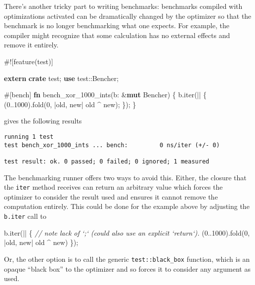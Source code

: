 \documentclass[a4paper,]{book}
\newenvironment{Shaded}{\begin{snugshade}}{\end{snugshade}}
\newcommand{\KeywordTok}[1]{\textcolor[rgb]{0.13,0.29,0.53}{\textbf{{#1}}}}
\newcommand{\DecValTok}[1]{\textcolor[rgb]{0.00,0.00,0.81}{{#1}}}
\newcommand{\CommentTok}[1]{\textcolor[rgb]{0.56,0.35,0.01}{\textit{{#1}}}}
\newcommand{\AttributeTok}[1]{\textcolor[rgb]{0.77,0.63,0.00}{{#1}}}
\newcommand{\NormalTok}[1]{{#1}}
\begin{document}
There's another tricky part to writing benchmarks: benchmarks compiled
with optimizations activated can be dramatically changed by the
optimizer so that the benchmark is no longer benchmarking what one
expects. For example, the compiler might recognize that some calculation
has no external effects and remove it entirely.

\begin{Shaded}
\begin{Highlighting}[]
\AttributeTok{#![}\NormalTok{feature}\AttributeTok{(}\NormalTok{test}\AttributeTok{)]}

\KeywordTok{extern} \KeywordTok{crate} \NormalTok{test;}
\KeywordTok{use} \NormalTok{test::Bencher;}

\AttributeTok{#[}\NormalTok{bench}\AttributeTok{]}
\KeywordTok{fn} \NormalTok{bench_xor_1000_ints(b: &}\KeywordTok{mut} \NormalTok{Bencher) \{}
    \NormalTok{b.iter(|| \{}
        \NormalTok{(}\DecValTok{0.}\NormalTok{.}\DecValTok{1000}\NormalTok{).fold(}\DecValTok{0}\NormalTok{, |old, new| old ^ new);}
    \NormalTok{\});}
\NormalTok{\}}
\end{Highlighting}
\end{Shaded}

gives the following results

\begin{verbatim}
running 1 test
test bench_xor_1000_ints ... bench:         0 ns/iter (+/- 0)

test result: ok. 0 passed; 0 failed; 0 ignored; 1 measured
\end{verbatim}

The benchmarking runner offers two ways to avoid this. Either, the
closure that the \texttt{iter} method receives can return an arbitrary
value which forces the optimizer to consider the result used and ensures
it cannot remove the computation entirely. This could be done for the
example above by adjusting the \texttt{b.iter} call to

\begin{Shaded}
\begin{Highlighting}[]
\NormalTok{b.iter(|| \{}
    \CommentTok{// note lack of `;` (could also use an explicit `return`).}
    \NormalTok{(}\DecValTok{0.}\NormalTok{.}\DecValTok{1000}\NormalTok{).fold(}\DecValTok{0}\NormalTok{, |old, new| old ^ new)}
\NormalTok{\});}
\end{Highlighting}
\end{Shaded}

Or, the other option is to call the generic \texttt{test::black\_box}
function, which is an opaque ``black box'' to the optimizer and so
forces it to consider any argument as used.
\end{document}
